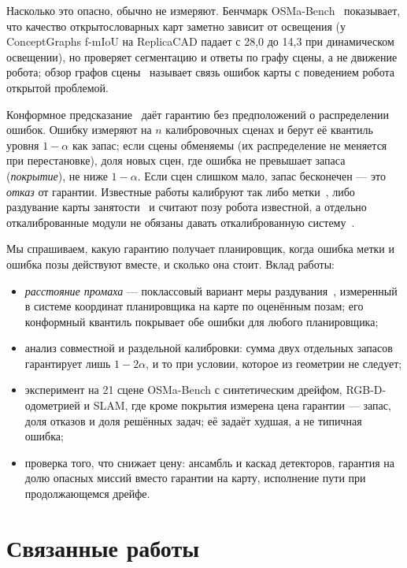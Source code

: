 \documentclass[conference,a4paper]{IEEEtran}
\theoremstyle{definition}
\begin{document}
Насколько это опасно, обычно не измеряют. Бенчмарк OSMa-Bench~\cite{osmabench} показывает, что качество открытословарных
карт заметно зависит от освещения (у ConceptGraphs f-mIoU на ReplicaCAD падает с 28,0 до 14,3 при динамическом
освещении), но проверяет сегментацию и ответы по графу сцены, а не движение робота; обзор графов сцены~\cite{survey3dsg}
называет связь ошибок карты с поведением робота открытой проблемой.

Конформное предсказание~\cite{gentle} даёт гарантию без предположений о распределении ошибок. Ошибку измеряют на $n$
калибровочных сценах и берут её квантиль уровня $1 - \alpha$ как запас; если сцены обменяемы (их распределение не
меняется при перестановке), доля новых сцен, где ошибка не превышает запаса (\emph{покрытие}), не ниже $1 - \alpha$.
Если сцен слишком мало, запас бесконечен --- это \emph{отказ} от гарантии. Известные работы калибруют так либо
метки~\cite{sundarsingh}, либо раздувание карты занятости~\cite{pwc} и считают позу робота известной, а отдельно
откалиброванные модули не обязаны давать откалиброванную систему~\cite{baral}.

Мы спрашиваем, какую гарантию получает планировщик, когда ошибка метки и ошибка позы действуют вместе, и сколько она
стоит. Вклад работы:
\begin{itemize}
  \item \emph{расстояние промаха} --- поклассовый вариант меры раздувания~\cite{pwc}, измеренный в системе координат
  планировщика на карте по оценённым позам; его конформный квантиль покрывает обе ошибки для любого планировщика;
  \item анализ совместной и раздельной калибровки: сумма двух отдельных запасов гарантирует лишь $1 - 2\alpha$, и то при
  условии, которое из геометрии не следует;
  \item эксперимент на 21 сцене OSMa-Bench с синтетическим дрейфом, RGB-D-одометрией и SLAM, где кроме покрытия измерена
  цена гарантии --- запас, доля отказов и доля решённых задач; её задаёт худшая, а не типичная ошибка;
  \item проверка того, что снижает цену: ансамбль и каскад детекторов, гарантия на долю опасных миссий вместо гарантии на
  карту, исполнение пути при продолжающемся дрейфе.
\end{itemize}

\section{Связанные работы}
\end{document}
